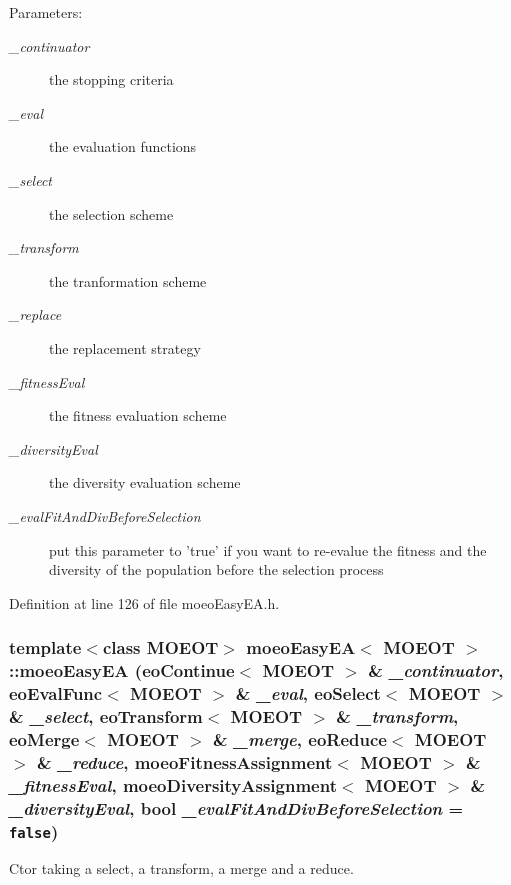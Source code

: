 \begin{Desc}
\item[Parameters:]
\begin{description}
\item[{\em \_\-continuator}]the stopping criteria \item[{\em \_\-eval}]the evaluation functions \item[{\em \_\-select}]the selection scheme \item[{\em \_\-transform}]the tranformation scheme \item[{\em \_\-replace}]the replacement strategy \item[{\em \_\-fitness\-Eval}]the fitness evaluation scheme \item[{\em \_\-diversity\-Eval}]the diversity evaluation scheme \item[{\em \_\-eval\-Fit\-And\-Div\-Before\-Selection}]put this parameter to 'true' if you want to re-evalue the fitness and the diversity of the population before the selection process \end{description}
\end{Desc}


Definition at line 126 of file moeo\-Easy\-EA.h.
\subsubsection{\setlength{\rightskip}{0pt plus 5cm}template$<$class MOEOT$>$ \bf{moeo\-Easy\-EA}$<$ MOEOT $>$::\bf{moeo\-Easy\-EA} (\bf{eo\-Continue}$<$ MOEOT $>$ \& {\em \_\-continuator}, \bf{eo\-Eval\-Func}$<$ MOEOT $>$ \& {\em \_\-eval}, \bf{eo\-Select}$<$ MOEOT $>$ \& {\em \_\-select}, \bf{eo\-Transform}$<$ MOEOT $>$ \& {\em \_\-transform}, \bf{eo\-Merge}$<$ MOEOT $>$ \& {\em \_\-merge}, \bf{eo\-Reduce}$<$ MOEOT $>$ \& {\em \_\-reduce}, \bf{moeo\-Fitness\-Assignment}$<$ MOEOT $>$ \& {\em \_\-fitness\-Eval}, \bf{moeo\-Diversity\-Assignment}$<$ MOEOT $>$ \& {\em \_\-diversity\-Eval}, bool {\em \_\-eval\-Fit\-And\-Div\-Before\-Selection} = {\tt false})\hspace{0.3cm}{\tt  [inline]}}\label{classmoeoEasyEA_564a3291a8239515328cf0a6b40f3c99}


Ctor taking a select, a transform, a merge and a reduce. 

